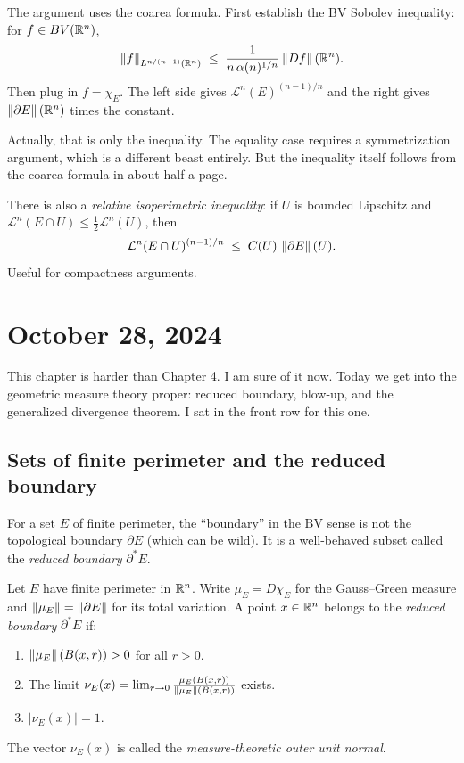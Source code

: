 The argument uses the coarea formula. First establish the BV Sobolev inequality: for $f \in BV(\mathbb{R}^n)$,
\[
  \left\|f\right\|_{L^{n/(n-1)}(\mathbb{R}^n)} \;\le\; \frac{1}{n\,\alpha(n)^{1/n}} \left\|Df\right\|(\mathbb{R}^n).
\]
Then plug in $f = \chi_E$. The left side gives $\mathcal{L}^n(E)^{(n-1)/n}$ and the right gives $\left\|\partial E\right\|(\mathbb{R}^n)$ times the constant.

Actually, that is only the inequality. The equality case requires a symmetrization argument, which is a different beast entirely. But the inequality itself follows from the coarea formula in about half a page.

There is also a \emph{relative isoperimetric inequality}: if $U$ is bounded Lipschitz and $\mathcal{L}^n(E \cap U) \le \frac{1}{2}\mathcal{L}^n(U)$, then
\[
  \mathcal{L}^n(E \cap U)^{(n-1)/n} \;\le\; C(U)\, \left\|\partial E\right\|(U).
\]
Useful for compactness arguments.


\section{October 28, 2024}\label{sec:oct28}

This chapter is harder than Chapter 4. I am sure of it now. Today we get into the geometric measure theory proper: reduced boundary, blow-up, and the generalized divergence theorem. I sat in the front row for this one.

\subsection{Sets of finite perimeter and the reduced boundary}\label{subsec:reduced-boundary}

For a set $E$ of finite perimeter, the ``boundary'' in the BV sense is not the topological boundary $\partial E$ (which can be wild). It is a well-behaved subset called the \emph{reduced boundary} $\partial^* E$.

\begin{definition}\label{def:reduced-boundary}
Let $E$ have finite perimeter in $\mathbb{R}^n$. Write $\mu_E = D\chi_E$ for the Gauss--Green measure and $\left\|\mu_E\right\| = \left\|\partial E\right\|$ for its total variation. A point $x \in \mathbb{R}^n$ belongs to the \emph{reduced boundary} $\partial^* E$ if:
\begin{enumerate}
  \item $\left\|\mu_E\right\|(B(x,r)) > 0$ for all $r > 0$.
  \item The limit $\nu_E(x) = \lim_{r \to 0} \frac{\mu_E(B(x,r))}{\left\|\mu_E\right\|(B(x,r))}$ exists.
  \item $|\nu_E(x)| = 1$.
\end{enumerate}
The vector $\nu_E(x)$ is called the \emph{measure-theoretic outer unit normal}.
\end{definition}

